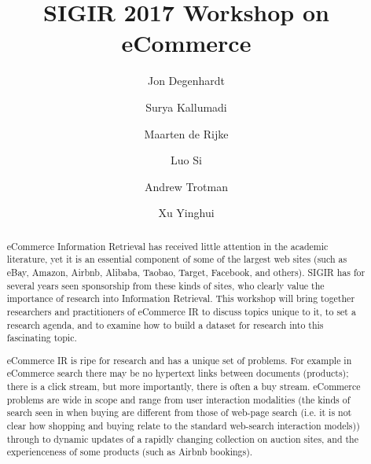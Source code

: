 \documentclass[sigconf]{acmart}
\begin{document}
\title{SIGIR 2017 Workshop on eCommerce}

\author{Jon Degenhardt}


\author{Surya Kallumadi}

\author{Maarten de Rijke}


\author{Luo Si}

\author{Andrew Trotman}

\author{Xu Yinghui}

\renewcommand{\shortauthors}{J. Degenhardt et al.}


\begin{abstract}
eCommerce Information Retrieval has received little attention in the
academic literature, yet it is an essential component of some of the
largest web sites (such as eBay, Amazon, Airbnb,  Alibaba, Taobao, Target, Facebook, and others).  SIGIR has for
several years seen sponsorship from these kinds of sites, who clearly value the
importance of research into Information Retrieval.  This
workshop will bring together researchers and practitioners of
eCommerce IR to discuss topics unique to it, to set a research agenda,
and to examine how to build a dataset for research into this fascinating topic.

eCommerce IR is ripe for research and has a unique
set of problems.  For example in eCommerce search there may be no hypertext links
between documents (products); there is a click stream, but more importantly, there
is often a buy stream.  eCommerce problems are wide in scope and range from user interaction
modalities (the kinds of search seen in when buying are different from those
of web-page search (i.e. it is not clear how shopping and buying relate to the standard
web-search interaction models)) through to dynamic updates of a rapidly
changing collection on auction sites, and the experienceness of some products (such as Airbnb bookings).
\end{abstract}

%
%
\end{document}
